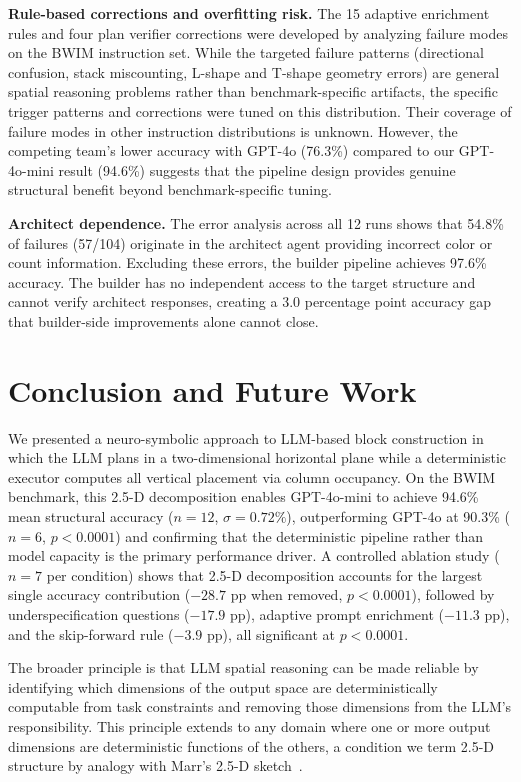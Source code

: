 \documentclass{article}
\begin{document}
\textbf{Rule-based corrections and overfitting risk.} The 15 adaptive
enrichment rules and four plan verifier corrections were developed by
analyzing failure modes on the BWIM instruction set. While the targeted
failure patterns (directional confusion, stack miscounting, L-shape and
T-shape geometry errors) are general spatial reasoning problems rather than
benchmark-specific artifacts, the specific trigger patterns and corrections
were tuned on this distribution. Their coverage of failure modes in other
instruction distributions is unknown. However, the competing team's lower
accuracy with GPT-4o (76.3\%) compared to our GPT-4o-mini result (94.6\%)
suggests that the pipeline design provides genuine structural benefit
beyond benchmark-specific tuning.

\textbf{Architect dependence.} The error analysis across all 12 runs shows
that 54.8\% of failures (57/104) originate in the architect agent providing
incorrect color or count information. Excluding these errors, the builder
pipeline achieves 97.6\% accuracy. The builder has no independent access
to the target structure and cannot verify architect responses, creating a
3.0 percentage point accuracy gap that builder-side improvements alone
cannot close.

\section{Conclusion and Future Work}

We presented a neuro-symbolic approach to LLM-based block construction in
which the LLM plans in a two-dimensional horizontal plane while a
deterministic executor computes all vertical placement via column occupancy.
On the BWIM benchmark, this 2.5-D decomposition enables GPT-4o-mini
to achieve 94.6\% mean structural accuracy ($n = 12$,
$\sigma = 0.72\%$), outperforming GPT-4o at 90.3\% ($n = 6$,
$p < 0.0001$) and confirming that the deterministic pipeline rather than
model capacity is the primary performance driver. A controlled ablation
study ($n = 7$ per condition) shows that 2.5-D decomposition accounts
for the largest single accuracy contribution ($-28.7$ pp when removed,
$p < 0.0001$), followed by underspecification questions ($-17.9$ pp),
adaptive prompt enrichment ($-11.3$ pp), and the skip-forward rule
($-3.9$ pp), all significant at $p < 0.0001$.

The broader principle is that LLM spatial reasoning can be made reliable by
identifying which dimensions of the output space are deterministically
computable from task constraints and removing those dimensions from the
LLM's responsibility. This principle extends to any domain where one or
more output dimensions are deterministic functions of the others, a
condition we term 2.5-D structure by analogy with Marr's 2.5-D
sketch~\cite{marr2010}.
\end{document}

